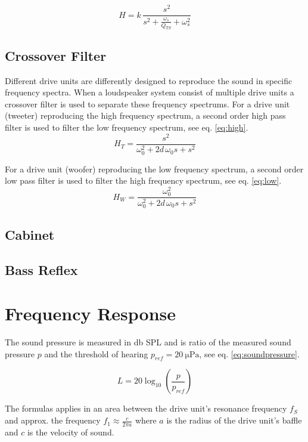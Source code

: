 \begin{equation}
H = k\,\dfrac{s^2}{s^2+\frac{\omega_s}{Q_{TS}}+\omega_s^2}
\label{eq:dutfderived}
\end{equation}

\subsection{Crossover Filter}
Different drive units are differently designed to reproduce the sound in specific frequency spectra.
When a loudspeaker system consist of multiple drive units a crossover filter is used to separate these frequency spectrums.
For a drive unit (tweeter) reproducing the high frequency spectrum, a second order high pass filter is used to filter the low frequency spectrum, see eq. \ref{eq:high}.
\begin{equation}
H_{T} = \frac{s^2}{\omega_0^2+2d\,\omega_0 s+s^2}
\label{eq:high}
\end{equation}

For a drive unit (woofer) reproducing the low frequency spectrum, a second order low pass filter is used to filter the high frequency spectrum, see eq. \ref{eq:low}.
\begin{equation}
H_{W} = \frac{\omega_0^2}{\omega_0^2+2d\,\omega_0 s+s^2}
\label{eq:low}
\end{equation}

\subsection{Cabinet}

\subsection{Bass Reflex}

\section{Frequency Response}
The sound pressure is measured in \si{\decibel} SPL and is ratio of the measured sound pressure $p$ and the threshold of hearing $p_{ref}=\SI{20}{\micro\pascal}$, see eq. \ref{eq:soundpressure}.

\begin{equation}
L=20\log_{10}\left(\frac{p}{p_{ref}}\right)
\label{eq:soundpressure}
\end{equation}

The formulas applies in an area between the drive unit's resonance frequency $f_S$ and approx. the frequency $f_1\approx\frac{c}{2\pi a}$ where $a$ is the radius of the drive unit's baffle and $c$ is the velocity of sound. \cite[p.~41]{Elektroakustik}

